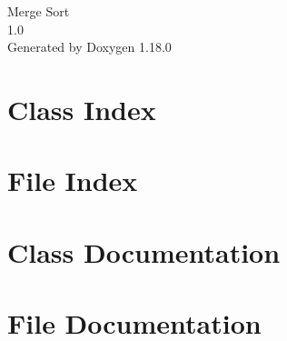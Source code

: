 \documentclass[twoside]{book}
\newcommand{\+}{\discretionary{\mbox{\scriptsize$\hookleftarrow$}}{}{}}
\newcommand{\clearemptydoublepage}{%
    \newpage{\pagestyle{empty}\cleardoublepage}%
  }
\begin{document}
  \raggedbottom
    \hypersetup{pageanchor=false,
                bookmarksnumbered=true,
                pdfencoding=unicode
               }
  \begin{titlepage}
  \vspace*{7cm}
  \begin{center}%
  {\Large Merge Sort}\\
  [1ex]\large 1.\+0 \\
  \vspace*{1cm}
  {\large Generated by Doxygen 1.18.0}\\
  \end{center}
  \end{titlepage}
  \clearemptydoublepage
  \tableofcontents
  \clearemptydoublepage
  \hypersetup{pageanchor=true}
\chapter{Class Index}

\chapter{File Index}

\chapter{Class Documentation}

\chapter{File Documentation}




  \backmatter
  \newpage
  \clearemptydoublepage
  \printindex
\end{document}
